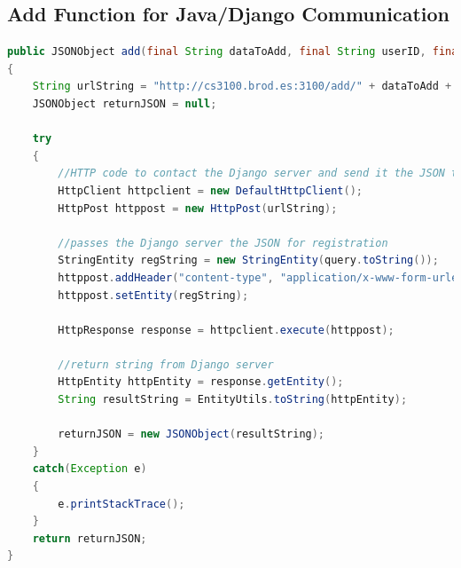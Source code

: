 \documentclass[a4paper]{article} %
\begin{document}
\pagebreak
\subsection{Add Function for Java/Django Communication} \label{Jabba Code}
\begin{lstlisting}[language=Java]
public JSONObject add(final String dataToAdd, final String userID, final String token, JSONObject query)
{
    String urlString = "http://cs3100.brod.es:3100/add/" + dataToAdd + "/?user=" + userID + "&token=" + token;
    JSONObject returnJSON = null;

    try
    {
        //HTTP code to contact the Django server and send it the JSON to register
        HttpClient httpclient = new DefaultHttpClient();
        HttpPost httppost = new HttpPost(urlString);

        //passes the Django server the JSON for registration
        StringEntity regString = new StringEntity(query.toString());
        httppost.addHeader("content-type", "application/x-www-form-urlencoded");
        httppost.setEntity(regString);

        HttpResponse response = httpclient.execute(httppost);

        //return string from Django server
        HttpEntity httpEntity = response.getEntity();
        String resultString = EntityUtils.toString(httpEntity);

        returnJSON = new JSONObject(resultString);
    }
    catch(Exception e)
    {
        e.printStackTrace();
    }
    return returnJSON;
}
\end{lstlisting}
\end{document}
